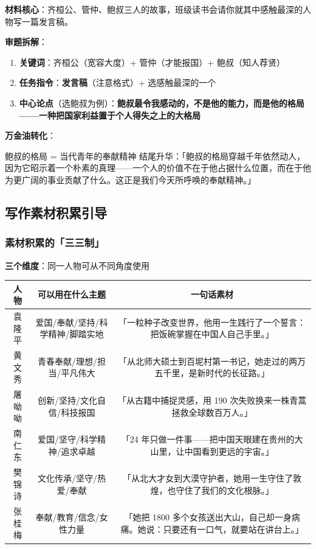 \textbf{材料核心}：齐桓公、管仲、鲍叔三人的故事，班级读书会请你就其中感触最深的人物写一篇发言稿。

\textbf{审题拆解}：

\begin{enumerate}
  \item \textbf{关键词}：齐桓公（宽容大度）+ 管仲（才能报国）+ 鲍叔（知人荐贤）
  \item \textbf{任务指令}：\textbf{发言稿}（注意格式）+ 选感触最深的一个
  \item \textbf{中心论点}（选鲍叔为例）：\textbf{鲍叔最令我感动的，不是他的能力，而是他的格局——一种把国家利益置于个人得失之上的大格局}
\end{enumerate}

\textbf{万金油转化}：

鲍叔的格局 = 当代青年的奉献精神
结尾升华：「鲍叔的格局穿越千年依然动人，因为它昭示着一个朴素的真理——一个人的价值不在于他占据什么位置，而在于他为更广阔的事业贡献了什么。这正是我们今天所呼唤的奉献精神。」

\subsection{写作素材积累引导}

\subsubsection{素材积累的「三三制」}

\textbf{三个维度}：同一人物可从不同角度使用

\begin{center}
\begin{tabular}{c|c|c}
\textbf{人物} & \textbf{可以用在什么主题} & \textbf{一句话素材} \\ \hline
袁隆平 & 爱国/奉献/坚持/科学精神/脚踏实地 & 「一粒种子改变世界，他用一生践行了一个誓言：把饭碗掌握在中国人自己手里。」 \\
黄文秀 & 青春奉献/理想/担当/平凡伟大 & 「从北师大硕士到百坭村第一书记，她走过的两万五千里，是新时代的长征路。」 \\
屠呦呦 & 创新/坚持/文化自信/科技报国 & 「从古籍中捕捉灵感，用 190 次失败换来一株青蒿拯救全球数百万人。」 \\
南仁东 & 爱国/坚守/科学精神/追求卓越 & 「24 年只做一件事——把中国天眼建在贵州的大山里，让中国看到更远的宇宙。」 \\
樊锦诗 & 文化传承/坚守/热爱/奉献 & 「从北大才女到大漠守护者，她用一生守住了敦煌，也守住了我们的文化根脉。」 \\
张桂梅 & 奉献/教育/信念/女性力量 & 「她把 1800 多个女孩送出大山，自己却一身病痛。她说：只要还有一口气，就要站在讲台上。」 \\
\end{tabular}
\end{center}

